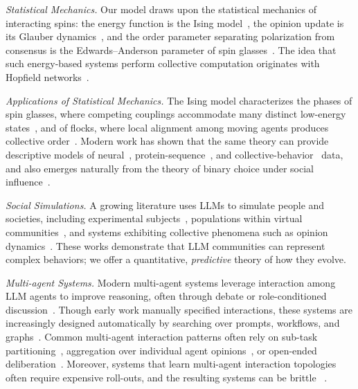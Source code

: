 \textit{Statistical Mechanics.} Our model draws upon the statistical
mechanics of interacting spins: the energy function is the Ising model~\citep{ising1925}, the opinion update is its Glauber dynamics~\citep{glauber1963}, and the order parameter separating polarization from consensus is the Edwards--Anderson parameter of
spin glasses~\citep{edwards1975,sherrington1975}. The idea that such energy-based systems perform collective computation originates with Hopfield networks~\citep{hopfield1982neural,amit1985storing}.


\textit{Applications of Statistical Mechanics.} The Ising model characterizes the phases of spin glasses, where competing couplings accommodate many distinct low-energy states~\citep{parisi1979,mezard1987}, and of flocks, where local alignment among moving agents produces collective order~\citep{vicsek1995,toner1995}. Modern work has shown that the same theory can provide descriptive models of neural~\citep{schneidman2006}, protein-sequence~\citep{weigt2009,marks2011}, and collective-behavior~\citep{bialek2012statistical} data, and also emerges naturally from the theory of binary choice under social influence~\citep{brock2001,castellano2009}.


\textit{Social Simulations.} A growing literature uses LLMs to simulate people and societies, including experimental
subjects~\citep{argyle2023,horton2023,park2024}, populations within virtual communities~\citep{park2023,yang2024oasis,piao2025}, and systems exhibiting collective phenomena such as opinion dynamics~\citep{chuang2024,ashery2025,demarzo2024}.
These works demonstrate that LLM communities can represent complex behaviors; we offer a quantitative, \textit{predictive} theory of how they evolve.

\textit{Multi-agent Systems.} Modern multi-agent systems leverage interaction among LLM agents to improve reasoning, often
through debate or role-conditioned discussion~\citep{du2023improvingfactualityreasoninglanguage,liang-etal-2024-encouraging,chen2023, Swanson2024.11.11.623004}. Though early work manually specified interactions, these systems are increasingly designed automatically by searching over prompts, workflows, and graphs~\citep{khattab2023,zhuge2024,hu2025automateddesignagenticsystems, nielsen2026learningorchestrateagentsnatural}. Common multi-agent interaction patterns often rely on sub-task partitioning~\citep{yang2025agentnetdecentralizedevolutionarycoordination, zhang2025aflowautomatingagenticworkflow}, aggregation over individual agent opinions~\citep{chen2024reconcile, wang2024mixtureofagentsenhanceslargelanguage}, or open-ended deliberation~\citep{du2023improvingfactualityreasoninglanguage}. Moreover, systems that learn multi-agent interaction topologies often require expensive roll-outs, and the resulting systems can be brittle ~\citep{cemri2025,wang2024bounds}. 


